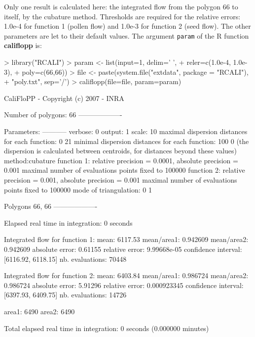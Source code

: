 \documentclass[a4paper,twoside,openright]{report}
\begin{document}
\label{example-parameter}
Only one result is calculated here: the integrated 
flow from the polygon
66 to itself, by the cubature method.
Thresholds are required for the relative errors:
 1.0e-4 for function 1 (pollen flow) and 
1.0e-3 for function 2 (seed flow).
The other parameters are let to their default values.
The argument \texttt{param} of the R function \textbf{califlopp} is:

\begin{Schunk}
\begin{Sinput}
> library("RCALI")
> param <- list(input=1, delim=' ', 
+          reler=c(1.0e-4, 1.0e-3),
+          poly=c(66,66))
> file <- paste(system.file("extdata", package = "RCALI"),
+           "poly.txt", sep='/')    
>  califlopp(file=file, param=param)
\end{Sinput}
\begin{Soutput}
CaliFloPP -  Copyright (c) 2007 - INRA

Number of polygons: 66
-------------------

Parameters:
-----------
verbose: 0
output: 1
scale: 10
maximal dispersion distances for each function: 0 21
minimal dispersion distances for each function: 100 0
(the dispersion is calculated between centroids,
 for distances beyond these values)
method:cubature
function 1: relative precision = 0.0001, absolute precision = 0.001
            maximal number of evaluations points fixed to 100000 
function 2: relative precision = 0.001, absolute precision = 0.001
            maximal number of evaluations points fixed to 100000 
mode of triangulation: 0 1

Polygons  66, 66
-------------------

Elapsed real time in integration: 0 seconds

Integrated flow for function 1:
 mean: 6117.53 mean/area1: 0.942609 mean/area2: 0.942609
 absolute error: 0.61155 relative error: 9.99668e-05
 confidence interval: [6116.92, 6118.15]
 nb. evaluations: 70448

Integrated flow for function 2:
 mean: 6403.84 mean/area1: 0.986724 mean/area2: 0.986724
 absolute error: 5.91296 relative error: 0.000923345
 confidence interval: [6397.93, 6409.75]
 nb. evaluations: 14726

area1: 6490 area2: 6490 


Total elapsed real time in integration: 0 seconds (0.000000 minutes)
\end{Soutput}
\end{Schunk}
\end{document}
